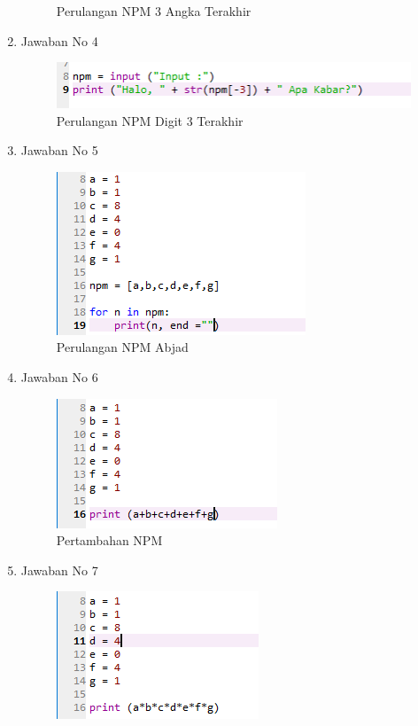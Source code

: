 \documentclass{article}
\begin{document}
\begin{enumerate}
\begin{figure}[!htbp]
        \caption{Perulangan NPM 3 Angka Terakhir}
    \end{figure}
    \item Jawaban No 4
    \begin{figure}[!htbp]
        \centering
        \includegraphics{PerulanganNPM3.PNG}
        \caption{Perulangan NPM Digit 3 Terakhir}
    \end{figure}
    \item Jawaban No 5
    \begin{figure}[!htbp]
        \centering
        \includegraphics{PerulanganNPM4.PNG}
        \caption{Perulangan NPM Abjad}
    \end{figure}
    \newpage
    \item Jawaban No 6
    \begin{figure}[!htbp]
        \centering
        \includegraphics{PertambahanNPM.PNG}
        \caption{Pertambahan NPM}
    \end{figure}
    \item Jawaban No 7
    \begin{figure}[!htbp]
        \centering
        \includegraphics{PerkalianNPM.PNG}

\end{figure}
\end{enumerate}
\end{document}
